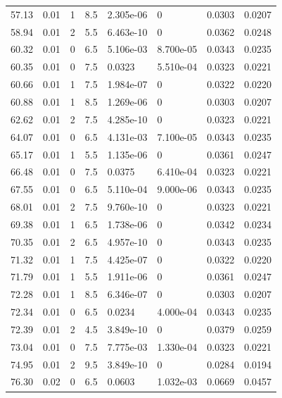 \documentclass[preview]{standalone}
\begin{document}
{{{\begin{tabular}{L{1.2cm}C{1.2cm} C{0.3cm}C{0.5cm} C{1.4cm}C{1.4cm} C{1.4cm}C{1.4cm}}
  57.13  &  0.01  & 1     & 8.5 &  2.305e-06  & 0  & 0.0303 &  0.0207   \\ 
  58.94  &  0.01  & 2     & 5.5 &  6.463e-10  & 0  & 0.0362 &  0.0248   \\ 
  60.32  &  0.01  & 0     & 6.5 &  5.106e-03  & 8.700e-05  & 0.0343 &  0.0235   \\ 
  60.35  &  0.01  & 0     & 7.5 &  0.0323  & 5.510e-04  & 0.0323 &  0.0221   \\ 
  60.66  &  0.01  & 1     & 7.5 &  1.984e-07  & 0  & 0.0322 &  0.0220   \\ 
  60.88  &  0.01  & 1     & 8.5 &  1.269e-06  & 0  & 0.0303 &  0.0207   \\ 
  62.62  &  0.01  & 2     & 7.5 &  4.285e-10  & 0  & 0.0323 &  0.0221   \\ 
  64.07  &  0.01  & 0     & 6.5 &  4.131e-03  & 7.100e-05  & 0.0343 &  0.0235   \\ 
  65.17  &  0.01  & 1     & 5.5 &  1.135e-06  & 0  & 0.0361 &  0.0247   \\ 
  66.48  &  0.01  & 0     & 7.5 &  0.0375  & 6.410e-04  & 0.0323 &  0.0221   \\ 
  67.55  &  0.01  & 0     & 6.5 &  5.110e-04  & 9.000e-06  & 0.0343 &  0.0235   \\ 
  68.01  &  0.01  & 2     & 7.5 &  9.760e-10  & 0  & 0.0323 &  0.0221   \\ 
  69.38  &  0.01  & 1     & 6.5 &  1.738e-06  & 0  & 0.0342 &  0.0234   \\ 
  70.35  &  0.01  & 2     & 6.5 &  4.957e-10  & 0  & 0.0343 &  0.0235   \\ 
  71.32  &  0.01  & 1     & 7.5 &  4.425e-07  & 0  & 0.0322 &  0.0220   \\ 
  71.79  &  0.01  & 1     & 5.5 &  1.911e-06  & 0  & 0.0361 &  0.0247   \\ 
  72.28  &  0.01  & 1     & 8.5 &  6.346e-07  & 0  & 0.0303 &  0.0207   \\ 
  72.34  &  0.01  & 0     & 6.5 &  0.0234  & 4.000e-04  & 0.0343 &  0.0235   \\ 
  72.39  &  0.01  & 2     & 4.5 &  3.849e-10  & 0  & 0.0379 &  0.0259   \\ 
  73.04  &  0.01  & 0     & 7.5 &  7.775e-03  & 1.330e-04  & 0.0323 &  0.0221   \\ 
  74.95  &  0.01  & 2     & 9.5 &  3.849e-10  & 0  & 0.0284 &  0.0194   \\ 
  76.30  &  0.02  & 0     & 6.5 &  0.0603  & 1.032e-03  & 0.0669 &  0.0457   \\ 

\end{tabular}}}}
\end{document}
